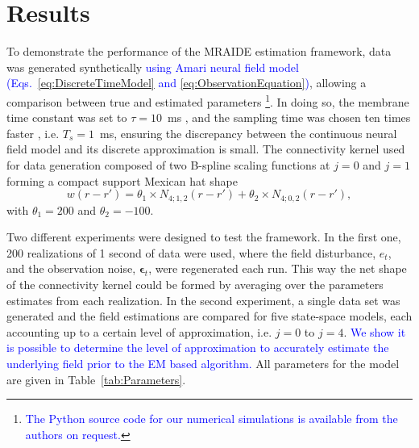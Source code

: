 \documentclass[review,authoryear,3p]{elsarticle}
\newcommand{\parham}[1]{\textcolor{blue}{#1}}
\begin{document}
\section{Results}\label{sec:MRA-results}
To demonstrate the performance of the MRAIDE estimation framework, data was generated synthetically \parham{using Amari neural field model  (Eqs.~\eqref{eq:DiscreteTimeModel} and \eqref{eq:ObservationEquation})}, allowing a comparison between true and estimated parameters \footnote{\parham{The Python source code for our numerical simulations is available from the authors on request.}}. In doing so, the membrane time constant was set to $\tau = 10$~ms \citep{David2003}, and the sampling time was chosen ten times faster \citep{Stephan2008}, i.e. $T_s = 1$~ms, ensuring the discrepancy between the continuous neural field model and its discrete approximation is small. The connectivity kernel used for data generation composed of two B-spline scaling functions at $j=0$ and $j=1$ forming a compact support Mexican hat shape 
\begin{equation}\label{eq:ConnectivityKernelForData}
	w(r-r')=\theta_1\times N_{4;1,2}(r-r')+\theta_2\times N_{4;0,2}(r-r'),
\end{equation}
with $\theta_1=200$ and $\theta_2=-100$. 

Two different experiments were designed to test the framework. In the first one, 200 realizations of 1 second of data were used, where the field disturbance, $e_t$, and the observation noise, $\boldsymbol\epsilon_t$, were regenerated each run. This way the net shape of the connectivity kernel could be formed by averaging over the parameters estimates from each realization. In the second experiment, a single data set was generated and the field estimations are compared for five state-space models, each accounting up to a certain level of approximation, i.e. $j=0$ to $j=4$. \parham{We show it is possible to determine the level of approximation to accurately estimate the underlying field prior to the EM based algorithm.} All parameters for the model are given in Table~\ref{tab:Parameters}.
\end{document}
